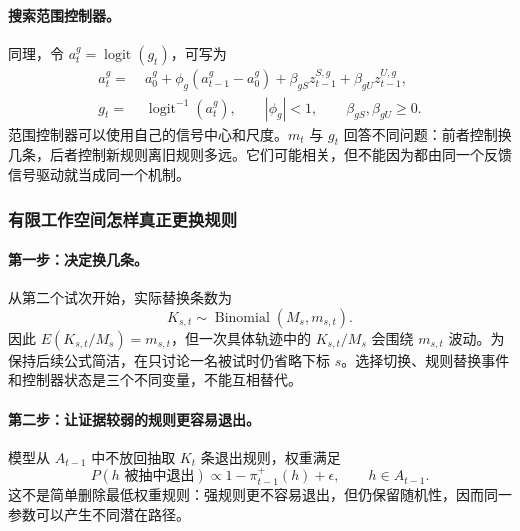 \paragraph{搜索范围控制器。}
同理，令 $a^g_t=\operatorname{logit}(g_t)$，可写为
\begin{align}
a^g_t
=\;&a^g_0+\phi_g(a^g_{t-1}-a^g_0)
+\beta_{gS}z^{S,g}_{t-1}+\beta_{gU}z^{U,g}_{t-1},
\nonumber\\
g_t
=\;&\operatorname{logit}^{-1}(a^g_t),
\qquad |\phi_g|<1,
\qquad \beta_{gS},\beta_{gU}\geq0.
\label{eq:model0809-range-controller}
\end{align}
范围控制器可以使用自己的信号中心和尺度。$m_t$ 与 $g_t$ 回答不同问题：前者控制换几条，后者控制新规则离旧规则多远。它们可能相关，但不能因为都由同一个反馈信号驱动就当成同一个机制。


\subsubsection{有限工作空间怎样真正更换规则}

\paragraph{第一步：决定换几条。}
从第二个试次开始，实际替换条数为
\begin{equation}
K_{s,t}\sim\operatorname{Binomial}(M_s,m_{s,t}).
\label{eq:model0809-replacement-count}
\end{equation}
因此 $E(K_{s,t}/M_s)=m_{s,t}$，但一次具体轨迹中的 $K_{s,t}/M_s$ 会围绕 $m_{s,t}$ 波动。为保持后续公式简洁，在只讨论一名被试时仍省略下标 $s$。选择切换、规则替换事件和控制器状态是三个不同变量，不能互相替代。

\paragraph{第二步：让证据较弱的规则更容易退出。}
模型从 $A_{t-1}$ 中不放回抽取 $K_t$ 条退出规则，权重满足
\begin{equation}
P(h\text{ 被抽中退出})
\propto 1-\pi^+_{t-1}(h)+\epsilon,
\qquad h\in A_{t-1}.
\label{eq:model0809-drop}
\end{equation}
这不是简单删除最低权重规则：强规则更不容易退出，但仍保留随机性，因而同一参数可以产生不同潜在路径。

